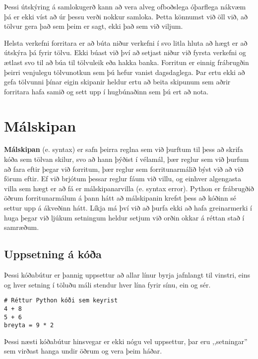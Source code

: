 
Þessi útskýring á samlokugerð kann að vera alveg ofboðslega óþarflega nákvæm þá er ekki víst að úr þessu verði nokkur samloka.
Þetta könnumst við öll við, að tölvur gera það sem þeim er sagt, ekki það sem við viljum.

Helsta verkefni forritara er að búta niður verkefni í svo litla hluta að hægt er að útskýra þá fyrir tölvu.
Ekki búast við því að setjast niður við fyrsta verkefni og ætlast svo til að búa til tölvuleik eða hakka banka.
Forritun er einnig frábrugðin þeirri venjulegu tölvunotkun sem þú hefur vanist dagsdaglega.
Þar ertu ekki að gefa tölvunni þínar eigin skipanir heldur ertu að beita skipunum sem aðrir forritara hafa samið og sett upp í hugbúnaðinn sem þú ert að nota.


\section{Málskipan}

\textbf{Málskipan} (e. syntax) er safn þeirra reglna sem við þurftum til þess að skrifa kóða sem tölvan skilur, svo að hann þýðist í vélamál, þær reglur sem við þurfum að fara eftir þegar við forritum, þær reglur sem forritunarmálið býst við að við förum eftir. 
Ef við brjótum þessar reglur fáum við villu, og einhver algengasta villa sem hægt er að fá er málskipanarvilla (e. syntax error). 
Python er frábrugðið öðrum forritunarmálum á þann hátt að málskipanin krefst þess að kóðinn sé settur upp á ákveðinn hátt. 
Líkja má því við að þurfa ekki að hafa greinarmerki í huga þegar við ljúkum setningum heldur setjum við orðin okkar á réttan stað í samræðum.

\subsection{Uppsetning á kóða}
Þessi kóðabútur er þannig uppsettur að allar línur byrja jafnlangt til vinstri, eins og hver setning í töluðu máli stendur hver lína fyrir sínu, ein og sér.
\begin{lstlisting}[caption=Réttur Python kóði, label=lst:inng-kóðadæmi]
# Réttur Python kóði sem keyrist
4 + 8
5 + 6
breyta = 9 * 2
\end{lstlisting}

Þessi næsti kóðabútur hinsvegar er ekki nógu vel uppsettur, þar eru ,,setningar'' sem virðast hanga undir öðrum og vera þeim háðar.

